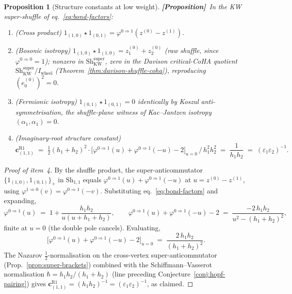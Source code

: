 \documentclass[11pt]{amsart}
\newtheorem{proposition}[theorem]{Proposition}
\theoremstyle{definition}
\providecommand{\ClaimStatusProposition}{\textbf{\textsf{[Proposition]}}}
\begin{document}
\begin{proposition}[Structure constants at low weight]
\label{prop:shuffle-structure}
\ClaimStatusProposition\
In the KW super-shuffle of eq.~\eqref{eq:bond-factors}:
\begin{enumerate}[leftmargin=2em]
\item (Cross product)
  $1_{(1,0)} \star 1_{(0,1)} = \varphi^{0 \Rightarrow 1}(z^{(0)} - z^{(1)})$.
\item (Bosonic isotropy)
  $1_{(1,0)} \star 1_{(1,0)} = z^{(0)}_1 + z^{(0)}_2$ (raw shuffle,
  since $\varphi^{0 \Rightarrow 0} = 1$); nonzero in
  $\mathrm{Sh}^{\mathrm{super}}_{\mathrm{KW}}$, zero in the Davison
  critical-CoHA quotient $\mathrm{Sh}^{\mathrm{super}}_{\mathrm{KW}}
  / I_{\mathrm{wheel}}$ (Theorem~\ref{thm:davison-shuffle-coha}),
  reproducing $(e^{(0)}_0)^2 = 0$.
\item (Fermionic isotropy)
  $1_{(0,1)} \star 1_{(0,1)} = 0$ identically by Koszul
  anti-symmetrisation, the shuffle-plane witness of Kac--Jantzen
  isotropy $(\alpha_1, \alpha_1) = 0$.
\item (Imaginary-root structure constant)
  \begin{equation}\label{eq:c11-shuffle}
    \mathbf{c}^{\mathrm{R1}}_{(1,1)}
    \;=\;
    \tfrac{1}{2}(h_1 + h_2)^{2}\cdot
    \bigl[\varphi^{0 \Rightarrow 1}(u) + \varphi^{0 \Rightarrow 1}(-u) - 2\bigr]_{u = 0}
    \,\big/\,h_1^2 h_2^2
    \;=\;
    \frac{1}{h_1 h_2}
    \;=\;
    (\varepsilon_1 \varepsilon_2)^{-1}.
  \end{equation}
\end{enumerate}
\end{proposition}

\begin{proof}[Proof of item~4]
By the shuffle product, the super-anticommutator
$\{1_{(1,0)}, 1_{(0,1)}\}_+$ in $\mathrm{Sh}_{1,1}$ equals
$\varphi^{0 \Rightarrow 1}(u) + \varphi^{0 \Rightarrow 1}(-u)$ at
$u = z^{(0)} - z^{(1)}$, using
$\varphi^{1 \Rightarrow 0}(v) = \varphi^{0 \Rightarrow 1}(-v)$.
Substituting eq.~\eqref{eq:bond-factors} and expanding,
\[
  \varphi^{0 \Rightarrow 1}(u)
  \;=\;
  1 + \frac{h_1 h_2}{u (u + h_1 + h_2)},
  \qquad
  \varphi^{0 \Rightarrow 1}(u) + \varphi^{0 \Rightarrow 1}(-u) - 2
  \;=\;
  \frac{-2\, h_1 h_2}{u^2 - (h_1 + h_2)^2},
\]
finite at $u = 0$ (the double pole cancels). Evaluating,
\[
  \bigl[\varphi^{0 \Rightarrow 1}(u) + \varphi^{0 \Rightarrow 1}(-u) - 2\bigr]_{u = 0}
  \;=\;
  \frac{2\, h_1 h_2}{(h_1 + h_2)^2}.
\]
The Nazarov $\tfrac12$-normalisation on the cross-vertex
super-anticommutator (Prop.~\ref{prop:super-brackets}) combined with
the Schiffmann--Vasserot normalisation $\hbar = h_1 h_2 / (h_1 + h_2)$
(line preceding Conjecture~\ref{conj:hopf-pairing}) gives
$\mathbf{c}^{\mathrm{R1}}_{(1,1)} = (h_1 h_2)^{-1} =
(\varepsilon_1 \varepsilon_2)^{-1}$, as claimed.
\end{proof}
\end{document}
